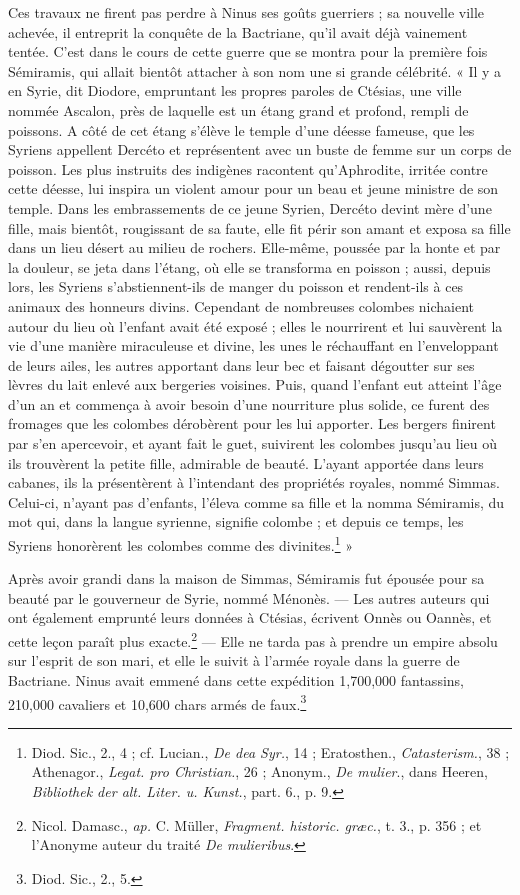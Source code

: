 \documentclass[a4paper, 11pt, oneside, landscape]{article}
\begin{document}
Ces travaux ne firent pas perdre à Ninus ses goûts guerriers ; sa nouvelle ville achevée, il entreprit la conquête de la Bactriane, qu'il avait déjà vainement tentée. C'est dans le cours de cette guerre que se montra pour la première fois Sémiramis, qui allait bientôt attacher à son nom une si grande célébrité. « Il y a en Syrie, dit Diodore, empruntant les propres paroles de Ctésias, une ville nommée Ascalon, près de laquelle est un étang grand et profond, rempli de poissons. A côté de cet étang s'élève le temple d'une déesse fameuse, que les Syriens appellent Dercéto et représentent avec un buste de femme sur un corps de poisson. Les plus instruits des indigènes racontent qu'Aphrodite, irritée contre cette déesse, lui inspira un violent amour pour un beau et jeune ministre de son temple. Dans les embrassements de ce jeune Syrien, Dercéto devint mère d'une fille, mais bientôt, rougissant de sa faute, elle fit périr son amant et exposa sa fille dans un lieu désert au milieu de rochers. Elle-même, poussée par la honte et par la douleur, se jeta dans l'étang, où elle se transforma en poisson ; aussi, depuis lors, les Syriens s'abstiennent-ils de manger du poisson et rendent-ils à ces animaux des honneurs divins. Cependant de nombreuses colombes nichaient autour du lieu où l'enfant avait été exposé ; elles le nourrirent et lui sauvèrent la vie d'une manière miraculeuse et divine, les unes le réchauffant en l'enveloppant de leurs ailes, les autres apportant dans leur bec et faisant dégoutter sur ses lèvres du lait enlevé aux bergeries voisines. Puis, quand l'enfant eut atteint l'âge d'un an et commença à avoir besoin d'une nourriture plus solide, ce furent des fromages que les colombes dérobèrent pour les lui apporter. Les bergers finirent par s'en apercevoir, et ayant fait le guet, suivirent les colombes jusqu'au lieu où ils trouvèrent la petite fille, admirable de beauté. L'ayant apportée dans leurs cabanes, ils la présentèrent à l'intendant des propriétés royales, nommé Simmas. Celui-ci, n'ayant pas d'enfants, l'éleva comme sa fille et la nomma Sémiramis, du mot qui, dans la langue syrienne, signifie colombe ; et depuis ce temps, les Syriens honorèrent les colombes comme des divinites.\footnote{Diod. Sic., 2., 4 ; cf. Lucian., \emph{De dea Syr.}, 14 ; Eratosthen., \emph{Catasterism.}, 38 ; Athenagor., \emph{Legat. pro Christian.}, 26 ; Anonym., \emph{De mulier}., dans Heeren, \emph{Bibliothek der alt. Liter. u. Kunst.}, part. 6., p. 9.} »

Après avoir grandi dans la maison de Simmas, Sémiramis fut épousée pour sa beauté par le gouverneur de Syrie, nommé Ménonès. --- Les autres auteurs qui ont également emprunté leurs données à Ctésias, écrivent Onnès ou Oannès, et cette leçon paraît plus exacte.\footnote{Nicol. Damasc., \emph{ap.} C. Müller, \emph{Fragment. historic. græc.}, t. 3., p. 356 ; et l'Anonyme auteur du traité \emph{De mulieribus}.} --- Elle ne tarda pas à prendre un empire absolu sur l'esprit de son mari, et elle le suivit à l'armée royale dans la guerre de Bactriane. Ninus avait emmené dans cette expédition 1,700,000 fantassins, 210,000 cavaliers et 10,600 chars armés de faux.\footnote{Diod. Sic., 2., 5.}
\end{document}
